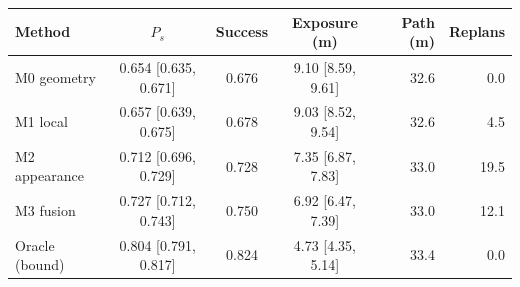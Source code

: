 \begin{tabular}{@{}lcccrr@{}}
\toprule
Method & $P_s$ & Success & Exposure (m) & Path (m) & Replans \\ \midrule
M0 geometry & 0.654 [0.635, 0.671] & 0.676 & 9.10 [8.59, 9.61] & 32.6 & 0.0 \\
M1 local & 0.657 [0.639, 0.675] & 0.678 & 9.03 [8.52, 9.54] & 32.6 & 4.5 \\
M2 appearance & 0.712 [0.696, 0.729] & 0.728 & 7.35 [6.87, 7.83] & 33.0 & 19.5 \\
M3 fusion & 0.727 [0.712, 0.743] & 0.750 & 6.92 [6.47, 7.39] & 33.0 & 12.1 \\
Oracle (bound) & 0.804 [0.791, 0.817] & 0.824 & 4.73 [4.35, 5.14] & 33.4 & 0.0 \\
\bottomrule
\end{tabular}